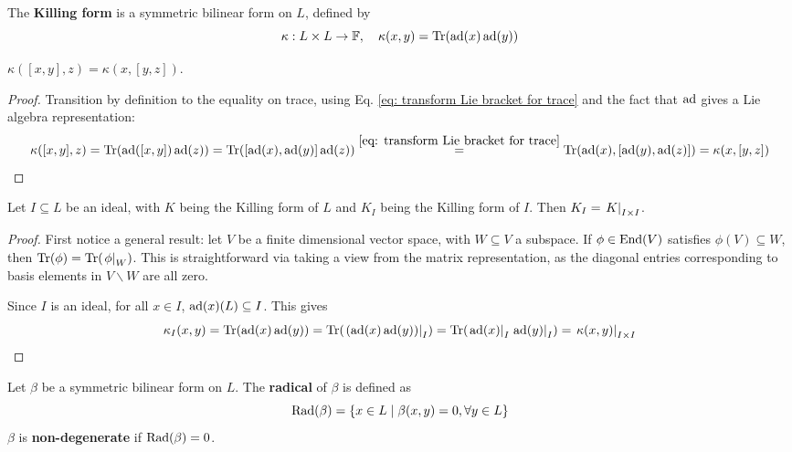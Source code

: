 \documentclass{article}
\begin{document}
\begin{definition}\label{def: Killing Form}
    The \textbf{Killing form} is a symmetric bilinear form on $L$, defined by
    \[
        \kappa: L \times L \to \mathbb{F}, \quad \kappa(x, y) = \operatorname{Tr}(\operatorname{ad}(x) \operatorname{ad}(y))
    \]
\end{definition}

\begin{lemma}\label{lem: transition of bracket in Killing form}
    $\kappa([x, y], z) = \kappa(x, [y, z])$.
\end{lemma}

\begin{proof}
    Transition by definition to the equality on trace, using Eq. \eqref{eq: transform Lie bracket for trace} and the fact that $\operatorname{ad}$ gives a Lie algebra representation:
    \[
        \kappa([x, y], z)
        = \operatorname{Tr}(\operatorname{ad}([x, y])\operatorname{ad}(z)) = \operatorname{Tr}([\operatorname{ad}(x), \operatorname{ad}(y)]\operatorname{ad}(z)) \overset{\eqref{eq: transform Lie bracket for trace}}{=} \operatorname{Tr}(\operatorname{ad}(x), [\operatorname{ad}(y), \operatorname{ad}(z)]) = \kappa(x, [y, z])
    \]
\end{proof}

\begin{lemma}\label{lem: restricting Killing form on ideal}
    Let $I \subseteq L$ be an ideal, with $K$ being the Killing form of $L$ and $K_I$ being the Killing form of $I$. Then $K_I = \left.K\right|_{I \times I}$.
\end{lemma}

\begin{proof}
    First notice a general result: let $V$ be a finite dimensional vector space, with $W \subseteq V$ a subspace. If $\phi \in \mathrm{End}(V)$ satisfies $\phi(V) \subseteq W$, then $\operatorname{Tr}(\phi) = \operatorname{Tr}(\left.\phi\right|_{W})$. This is straightforward via taking a view from the matrix representation, as the diagonal entries corresponding to basis elements in $V \smallsetminus W$ are all zero.

    Since $I$ is an ideal, for all $x \in I$, $\operatorname{ad}(x)(L) \subseteq I$. This gives
    \[
        \kappa_I(x, y) = \operatorname{Tr}(\operatorname{ad}(x) \operatorname{ad}(y)) = \operatorname{Tr}( \left.(\operatorname{ad}(x) \operatorname{ad}(y))\right|_{I} ) = \operatorname{Tr}(\left.\operatorname{ad}(x)\right|_{I} \left.\operatorname{ad}(y)\right|_{I}) = \left.\kappa(x, y)\right|_{I \times I}
    \]
\end{proof}

\begin{definition}
    Let $\beta$ be a symmetric bilinear form on $L$. The \textbf{radical} of $\beta$ is defined as
    \[
        \operatorname{Rad}(\beta) = \{ x \in L \mid \beta(x, y) = 0, \forall y \in L \}
    \]
    $\beta$ is \textbf{non-degenerate} if $\operatorname{Rad}(\beta) = 0$.
\end{definition}
\end{document}
